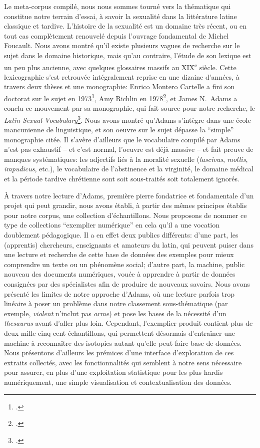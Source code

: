 Le meta-corpus compilé, nous nous sommes tourné vers la thématique qui constitue notre terrain d'essai, à savoir la sexualité dans la littérature latine classique et tardive. L'histoire de la sexualité est un domaine très récent, ou en tout cas complètement renouvelé depuis l'ouvrage fondamental de Michel Foucault. Nous avons montré qu'il existe plusieurs vagues de recherche sur le sujet dans le domaine historique, mais qu'au contraire, l'étude de son lexique est un peu plus ancienne, avec quelques glossaires massifs au XIX\textsuperscript{e} siècle. Cette lexicographie s'est retrouvée intégralement reprise en une dizaine d'années, à travers deux thèses et une monographie: Enrico Montero Cartelle a fini son doctorat sur le sujet en 1973\footcite{montero_cartelle_aspectos_1973}, Amy Richlin en 1978\footcite{richlin_sexual_1978}, et James N.~Adams a conclu ce mouvement par sa monographie, qui fait source pour notre recherche, le \textit{Latin Sexual Vocabulary}\footcite{adams}. Nous avons montré qu'Adams s'intègre dans une école mancunienne de linguistique, et son oeuvre sur le sujet dépasse la \enquote{simple} monographie citée. Il s'avère d'ailleurs que le vocabulaire compilé par Adams n'est pas exhaustif -- et c'est normal, l'oeuvre est déjà massive -- et fait preuve de manques systématiques: les adjectifs liés à la moralité sexuelle (\textit{lascivus}, \textit{mollis}, \textit{impudicus}, etc.), le vocabulaire de l'abstinence et la virginité, le domaine médical et la période tardive chrétienne sont soit sous-traités soit totalement ignorés.

À travers notre lecture d'Adams, première pierre fondatrice et fondamentale d'un projet qui peut grandir, nous avons établi, à partir des mêmes principes établis pour notre corpus, une collection d'échantillons. Nous proposons de nommer ce type de collections \enquote{exemplier numérique} en cela qu'il a une vocation doublement pédagogique. Il a en effet deux publics différents: d'une part, les (apprentis) chercheurs, enseignants et amateurs du latin, qui peuvent puiser dans une lecture et recherche de cette base de données des exemples pour mieux comprendre un texte ou un phénomène social; d'autre part, la machine, public nouveau des documents numériques, vouée à apprendre à partir de données consignées par des spécialistes afin de produire de nouveaux savoirs. Nous avons présenté les limites de notre approche d'Adams, où une lecture parfois trop linéaire à poser un problème dans notre classement sous-thématique (par exemple, \textit{violent} n'inclut pas \textit{arme}) et pose les bases de la nécessité d'un \textit{thesaurus} avant d'aller plus loin. Cependant, l'exemplier produit contient plus de deux mille cinq cent échantillons, qui permettent désormais d'entraîner une machine à reconnaître des isotopies autant qu'elle peut faire base de données. Nous présentons d'ailleurs les prémices d'une interface d'exploration de ces extraits collectés, avec les fonctionnalités qui semblent à notre sens nécessaire pour assurer, en plus d'une exploitation statistique pour les plus hardis numériquement, une simple visualisation et contextualisation des données.

